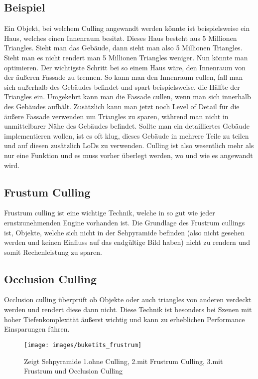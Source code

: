 \subsection{Beispiel}
Ein Objekt, bei welchem Culling angewandt werden könnte ist beispielsweise ein Haus, welches einen Innenraum besitzt. Dieses Haus besteht aus 5 Millionen Triangles. Sieht man das Gebäude, dann sieht man also 5 Millionen Triangles. Sieht man es nicht rendert man 5 Millionen Triangles weniger. Nun könnte man optimieren.
Der wichtigste Schritt bei so einem Haus wäre, den Innenraum von der äußeren Fassade zu trennen. So kann man den Innenraum cullen, fall man sich außerhalb des Gebäudes befindet und spart beispielsweise. die Hälfte der Triangles ein. Umgekehrt kann man die Fassade cullen, wenn man sich innerhalb des Gebäudes aufhält.
Zusätzlich kann man jetzt noch Level of Detail für die äußere Fassade verwenden um Triangles zu sparen, während man nicht in unmittelbarer Nähe des Gebäudes befindet. Sollte man ein detailliertes Gebäude implementieren wollen, ist es oft klug, dieses Gebäude in mehrere Teile zu teilen und auf diesen zusätzlich LoDs zu verwenden. Culling ist also wesentlich mehr als nur eine Funktion und es muss vorher überlegt werden, wo und wie es angewandt wird.

\cite{_cryengine_culling}

\subsection{Frustum Culling}
Frustrum culling ist eine wichtige Technik, welche in so gut wie jeder ernstzunehmenden Engine vorhanden ist. Die Grundlage des Frustrum cullings ist, Objekte, welche sich nicht in der Sehpyramide befinden (also nicht gesehen werden und keinen Einfluss auf das endgültige Bild haben) nicht zu rendern und somit Rechenleistung zu sparen.
\cite{_cryengine_culling}

\subsection{Occlusion Culling}
Occlusion culling überprüft ob Objekte oder auch triangles von anderen verdeckt werden und rendert diese dann nicht. Diese Technik ist besonders bei Szenen mit hoher Tiefenkomplexität äußerst wichtig und kann zu erheblichen Performance Einsparungen führen.
\cite{_cryengine_culling}

\begin{figure}[H]
	\centering
	\texttt{[image: images/buketits\_frustrum]}
	\caption{Zeigt Sehpyramide 1.ohne Culling, 2.mit Frustrum Culling, 3.mit Frustrum und Occlusion Culling\cite{_culling}}
\end{figure}

